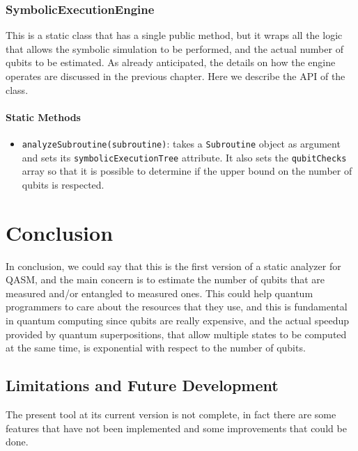 \documentclass[12pt,a4paper]{report}
\theoremstyle{definition}
\theoremstyle{definition}
\theoremstyle{definition}
\begin{document}
\subsection{SymbolicExecutionEngine}
This is a static class that has a single public method, but it wraps all the logic that allows the symbolic simulation to be performed, and the actual number of qubits to be estimated. As already anticipated, the details on how the engine operates are discussed in the previous chapter. Here we describe the API of the class.
\subsubsection{Static Methods}
\begin{itemize}
    \itemsep 0em
    \item \texttt{analyzeSubroutine(subroutine)}: takes a \texttt{Subroutine} object as argument and sets its \texttt{symbolicExecutionTree} attribute. It also sets the \texttt{qubitChecks} array so that it is possible to determine if the upper bound on the number of qubits is respected.
\end{itemize}





\chapter{Conclusion}
In conclusion, we could say that this is the first version of a static analyzer for QASM, and the main concern is to estimate the number of qubits that are measured and/or entangled to measured ones. This could help quantum programmers to care about the resources that they use, and this is fundamental in quantum computing since qubits are really expensive, and the actual speedup provided by quantum superpositions, that allow multiple states to be computed at the same time, is exponential with respect to the number of qubits.\\


\section{Limitations and Future Development}
The present tool at its current version is not complete, in fact there are some features that have not been implemented and some improvements that could be done.
\end{document}
